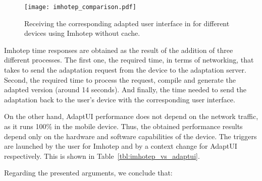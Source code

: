 \begin{figure}[H]
\centering
\texttt{[image: imhotep\_comparison.pdf]}
\caption{Receiving the corresponding adapted user interface in for different
devices using Imhotep without cache.}
\label{fig:imhotep_comparison}
\end{figure}


Imhotep time responses are obtained as the result of the addition of three
different processes. The first one, the required time, in terms of networking,
that takes to send the adaptation request from the device to the adaptation 
server. Second, the required time to process the request, compile and generate 
the adapted version (around 14 seconds). And finally, the time needed to send 
the adaptation back to the user's device with the corresponding user interface. 

On the other hand, AdaptUI performance does not depend on the network traffic, 
as it runs 100\% in the mobile device. Thus, the obtained performance results 
depend only on the hardware and software capabilities of the device. The 
triggers are launched by the user for Imhotep and by a context change for 
AdaptUI respectively. This is shown in Table~\ref{tbl:imhotep_vs_adaptui}.

Regarding the presented arguments, we conclude that:

